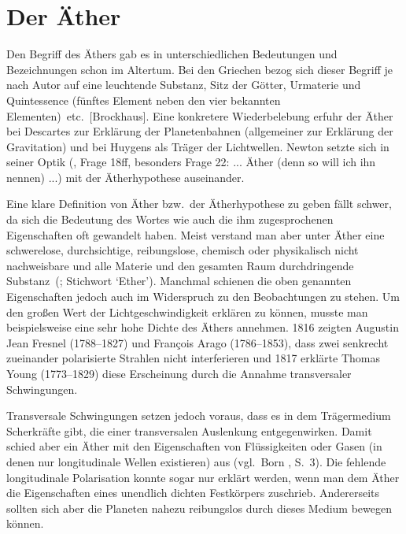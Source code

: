 \section{Der \"Ather}

Den Begriff des \"Athers gab es in unterschiedlichen Bedeutungen und Bezeichnungen
schon im Altertum. Bei den Griechen bezog sich dieser Begriff 
je nach Autor auf eine \glqq leuchtende
Substanz\grqq, \glqq Sitz der G\"otter\grqq, \glqq Urmaterie und Quintessence 
(f\"unftes
Element neben den vier bekannten Elementen)\grqq\ etc.\ [Brockhaus].  
Eine konkretere Wiederbelebung erfuhr der \"Ather bei Descartes zur
Erkl\"arung der Planetenbahnen (allgemeiner zur Erkl\"arung der
Gravitation) \cite{Descartes} und bei Huygens als Tr\"ager der Lichtwellen.
Newton setzte sich in seiner Optik (\cite{Newton2}, Frage 18ff, besonders
Frage 22: \glqq ... \"Ather (denn so will ich ihn nennen) ...\grqq) mit der
\"Atherhypothese auseinander. 

Eine klare Definition von \"Ather bzw.\ der \"Atherhypothese zu
geben f\"allt schwer, da sich die Bedeutung des Wortes wie auch die
ihm zugesprochenen Eigenschaften oft gewandelt haben. Meist verstand
man aber unter \"Ather eine \glqq schwerelose, durchsichtige, reibungslose, 
chemisch oder physikalisch nicht nachweisbare und alle Materie und den 
gesamten Raum durchdringende Substanz\grqq\ (\cite{Britannica}; Stichwort 
`Ether'). Manchmal schienen die oben genannten Eigenschaften
jedoch auch im Widerspruch zu den Beobachtungen zu stehen.
Um den gro\ss en Wert der Lichtgeschwindigkeit erkl\"aren
zu k\"onnen, musste man beispielsweise eine
sehr hohe Dichte des \"Athers annehmen. 1816 zeigten 
Augustin Jean Fresnel (1788--1827) und Fran\c{c}ois Arago
(1786--1853), dass zwei senkrecht zueinander polarisierte Strahlen
nicht interferieren und 1817 erkl\"arte Thomas Young 
(1773--1829) diese Erscheinung durch
die Annahme transversaler Schwingungen. 

Transversale Schwingungen setzen jedoch voraus, dass es in
dem Tr\"agermedium Scherkr\"afte gibt, die einer transversalen
Auslenkung entgegenwirken. Damit schied aber ein
\"Ather mit den Eigenschaften von Fl\"ussigkeiten oder
Gasen (in denen nur
longitudinale Wellen existieren) aus (vgl.\ Born \cite{Born}, S.~3). 
Die fehlende longitudinale Polarisation konnte sogar nur 
erkl\"art werden, wenn man dem  
\"Ather die Eigenschaften eines unendlich dichten Festk\"orpers 
zuschrieb. Andererseits sollten sich aber die Planeten 
nahezu reibungslos durch dieses Medium bewegen k\"onnen.

